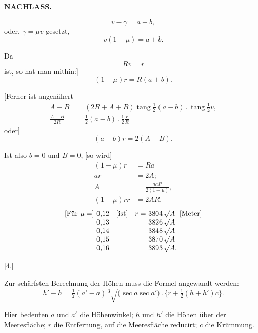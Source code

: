 \par\clearpage
\noindent{}\hfill{\small\textbf{NACHLASS.}}\hfill\null\par\medskip
\begingroup
\setlength{\abovedisplayskip}{5pt}\setlength{\belowdisplayskip}{5pt}
\[
v-\gamma=a+b,
\]
\noindent oder, \(\gamma=\mu v\) gesetzt,
\[
v(1-\mu)=a+b.
\]
\par\noindent\hspace*{\parindent}Da
\[
Rv=r
\]
\noindent ist, so hat man mithin:]
\[
(1-\mu)r=R(a+b).
\]
\par\noindent\hspace*{\parindent}[Ferner ist angenähert
\[
\begin{aligned}
A-B&=(2R+A+B)\operatorname{tang}\tfrac12(a-b)\mathbin{.}\operatorname{tang}\tfrac12v,\\
\tfrac{A-B}{2R}&=\tfrac12(a-b)\mathbin{.}\tfrac12\tfrac rR
\end{aligned}
\]
\noindent oder]
\[
(a-b)r=2(A-B).
\]
\par\noindent\hspace*{\parindent}Ist also \(b=0\) und \(B=0\), [so wird]
\[
\begin{aligned}
(1-\mu)r&=Ra\\
ar&=2A;\\
A&=\tfrac{aaR}{2(1-\mu)},\\
(1-\mu)rr&=2AR.
\end{aligned}
\]
\[
\begin{array}{@{}r@{\ }l@{\quad}l@{\quad}r@{\ }l@{\ }l@{}}
\text{[Für }\mu=] & 0{,}12 & \text{[ist]} & r= & 3804\,\surd A & \text{[Meter]}\\
 &0{,}13&&&3826\,\surd A&\\
 &0{,}14&&&3848\,\surd A&\\
 &0{,}15&&&3870\,\surd A&\\
 &0{,}16&&&3893\,\surd A.&
\end{array}
\]
\par\medskip
\begin{center}
[4.]\par{}
\end{center}
\par\noindent\hspace*{\parindent}Zur schärfsten Berechnung der Höhen muss die Formel angewandt werden:
\[
h'-h=\tfrac12(a'-a)\,{}^3\!\surd(\sec a\sec a')\mathbin{.}\{r+\tfrac12(h+h')c\}.
\]
\par\noindent\hspace*{\parindent}Hier bedeuten \(a\) und \(a'\) die Höhenwinkel; \(h\) und \(h'\) die Höhen über der
Meeresfläche; \(r\) die Entfernung, auf die Meeresfläche reducirt; \(c\) die Krümmung.
\endgroup

